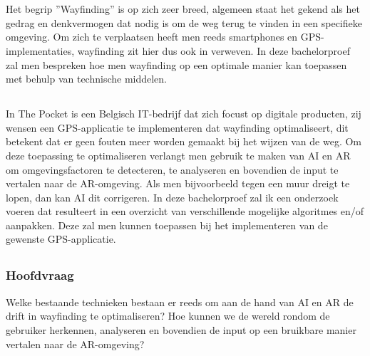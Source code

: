 \chapter{}
\label{ch:inleiding}

\section{}
\label{sec:wayfinding}
Het begrip ''Wayfinding'' is op zich zeer breed, algemeen staat het gekend als het gedrag en denkvermogen dat nodig is om de weg terug te vinden in een specifieke omgeving. Om zich te verplaatsen heeft men reeds smartphones en GPS-implementaties, wayfinding zit hier dus ook in verweven. In deze bachelorproef zal men bespreken hoe men wayfinding op een optimale manier kan toepassen met behulp van technische middelen.

\section{}
\label{sec:probleemstelling}

In The Pocket is een Belgisch IT-bedrijf dat zich focust op digitale producten, zij wensen een GPS-applicatie te implementeren dat wayfinding optimaliseert, dit betekent dat er geen fouten meer worden gemaakt bij het wijzen van de weg. Om deze toepassing te optimaliseren verlangt men gebruik te maken van AI en AR om omgevingsfactoren te detecteren, te analyseren en bovendien de input te vertalen naar de AR-omgeving. Als men bijvoorbeeld tegen een muur dreigt te lopen, dan kan AI dit corrigeren. In deze bachelorproef zal ik een onderzoek voeren dat resulteert in een overzicht van verschillende mogelijke algoritmes en/of aanpakken. Deze zal men kunnen toepassen bij het implementeren van de gewenste GPS-applicatie.

\section{}
\label{sec:onderzoeksvraag}

\subsection{Hoofdvraag}
Welke bestaande technieken bestaan er reeds om aan de hand van AI en AR de drift in wayfinding te optimaliseren? Hoe kunnen we de wereld rondom de gebruiker herkennen, analyseren en bovendien de input op een bruikbare manier vertalen naar de AR-omgeving?


